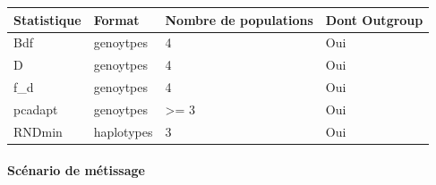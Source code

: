 \documentclass[12pt,twoside]{reedthesis}
\begin{document}
  \begin{Shaded}
  \begin{Highlighting}[]
  \StringTok{ }\NormalTok{(} \NormalTok{(}\NormalTok{, }\NormalTok{, }\NormalTok{, }\NormalTok{, }\NormalTok{),}
                       \NormalTok{(}\NormalTok{, }\NormalTok{, }\NormalTok{, }\NormalTok{, }\NormalTok{),}
                       \NormalTok{(}\NormalTok{, }\NormalTok{, }\NormalTok{, }\NormalTok{, }\NormalTok{),}
                       \NormalTok{(}\NormalTok{, }\NormalTok{, }\NormalTok{, }\NormalTok{, }\NormalTok{))}
  
                \NormalTok{(}\NormalTok{, }
                             \NormalTok{,}
                             \NormalTok{, }
                             \NormalTok{), }
                \NormalTok{)}
  \end{Highlighting}
  \end{Shaded}
  
  \begin{tabular}{l|l|l|l}
  \hline
  Statistique & Format & Nombre de populations & Dont Outgroup\\
  \hline
  Bdf & genoytpes & 4 & Oui\\
  \hline
  D & genoytpes & 4 & Oui\\
  \hline
  f\_d & genoytpes & 4 & Oui\\
  \hline
  pcadapt & genoytpes & >= 3 & Oui\\
  \hline
  RNDmin & haplotypes & 3 & Oui\\
  \hline
  \end{tabular}
  
  \paragraph{Scénario de métissage}\label{scenario-de-metissage}
  
\end{document}
